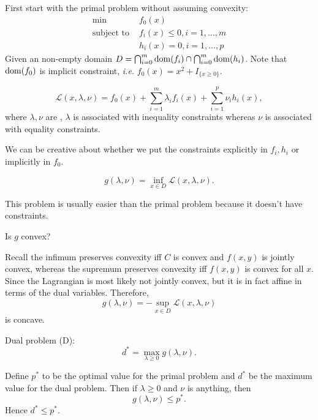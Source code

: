\documentclass[class=article,crop=false]{standalone}
\begin{document}
First start with the primal problem without assuming convexity:
\begin{align*}
\min\ &f_0(x) \\
\text{subject to } &f_i(x) \leq 0, i = 1,\ldots,m \\
&h_i(x) = 0 , i = 1,\ldots,p
\end{align*}
Given an non-empty domain $ D = \bigcap_{i=0}^m \operatorname{dom}(f_i) \cap \bigcap_{ i=0}^{m} \operatorname{dom}(h_i)$. Note that $ \operatorname{dom} (f_0) $ is implicit constraint, \emph{i.e.} $ f_0(x) = x^2 + I_{ \{x\geq 0\} }$.

\begin{defn}[lagrangian]
\[
	\mathscr{L}(x, \lambda, \nu) = f_0(x) + \sum_{ i= 1}^{ m} \lambda_i f_i(x) + \sum_{ i= 1}^{ p} \nu_i h_i(x)
,\]
where $ \lambda,\nu$ are , $ \lambda$ is associated with inequality constraints whereas $ \nu$ is associated with equality constraints.
\end{defn}
\begin{remark}
	We can be creative about whether we put the constraints explicitly in $ f_i, h_i$ or implicitly in $ f_0$.
\end{remark}

\begin{defn}
\[
	g( \lambda, \nu) = \inf_{x \in D} \mathscr{L}(x, \lambda, \nu)
.\] 
\end{defn}
\begin{note}
This problem is usually easier than the primal problem because it doesn't have constraints.
\end{note}

\begin{ques}
Is $ g$ convex?
\end{ques}
Recall the infimum preserves convexity iff  $ C$ is convex and  $ f(x,y)$ is jointly convex, whereas the supremum preserves convexity iff $ f(x,y)$ is convex for all  $ x$. Since the Lagrangian is most likely not jointly convex, but it is in fact affine in terms of the dual variables. Therefore,
 \[
	 g(\lambda,\nu) = - \sup_{x \in D} \mathscr{L}(x, \lambda,\nu)
\]
is concave.


Dual problem (D):
\[
	d^* = \max_{\lambda \geq 0} g(\lambda,\nu)
.\] 
\begin{prop}
Define $ p^*$ to be the optimal value for the primal problem and $ d^* $ be the maximum value for the dual problem. Then if $ \lambda \geq 0$ and $ \nu$ is anything, then
\[
	g(\lambda,\nu) \leq p^* 
.\]
Hence $ d^* \leq p^* $. 
\end{prop}
\end{document}
